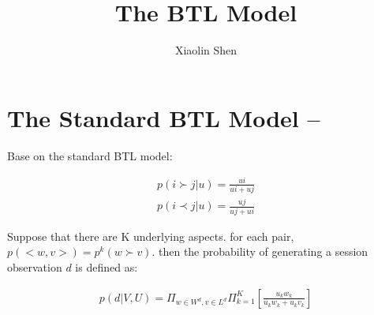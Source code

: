 \documentclass{article}
\title{The BTL Model}
\author{Xiaolin Shen}
\begin{document}
\maketitle


\section{The Standard BTL Model --}
Base on the standard BTL model:

\begin{align*}
	p(i \succ j |u)=\frac{ui}{ui+ uj} \\
	p(i \prec j |u)=\frac{uj}{uj+ ui} 
\end{align*}

 Suppose that there are K underlying aspects. for each pair, $p(<w,v>) = p^k(w\succ v) $. then the probability of generating a session observation $d$ is defined as:

\begin{align}\label{equ:skyline}
p(d|V,U)
=\Pi_{w\in W^d, v\in L^d} \Pi_{k=1}^{K}[ {\frac{u_k w_k}{u_k w_k+u_k v_k}}]
\end{align}
\end{document}
